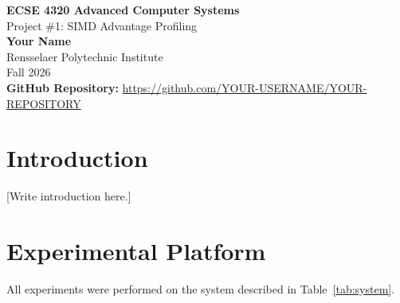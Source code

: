 \documentclass[11pt]{article}
\begin{document}
\begin{center}
    {\LARGE \textbf{ECSE 4320 Advanced Computer Systems}}\\[0.4em]
    {\Large Project \#1: SIMD Advantage Profiling}\\[1em]

    \textbf{Your Name}\\
    Rensselaer Polytechnic Institute\\
    Fall 2026\\[0.5em]

    \textbf{GitHub Repository:}
    \url{https://github.com/YOUR-USERNAME/YOUR-REPOSITORY}
\end{center}

\vspace{1em}

\section{Introduction}

%
%

[Write introduction here.]

\section{Experimental Platform}

All experiments were performed on the system described in
Table~\ref{tab:system}.
\end{document}
